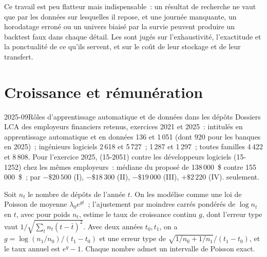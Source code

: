 Ce travail est peu flatteur mais indispensable~: un résultat de recherche ne vaut que par les données sur lesquelles il repose, et une journée manquante, un
horodatage erroné ou un univers biaisé par la survie peuvent produire un backtest faux dans chaque détail. Les  sont
jugés sur l'exhaustivité, l'exactitude et la ponctualité de ce qu'ils servent, et sur le coût de leur stockage et de leur transfert.

\section{Croissance et rémunération}

\begin{dated}{2025-09}{Rôles d'apprentissage automatique et de données dans les dépôts}\label{dat:in:machine-learning-and-data-engineer:filings}
Dossiers LCA des employeurs financiers retenus, exercices 2021 et 2025~: intitulés en apprentissage automatique et en données
136 et 1\,051 (dont 920 pour les banques en 2025)~; ingénieurs logiciels 2\,618 et 5\,727~;  1\,287 et 1\,297~;
toutes familles 4\,422 et 8\,808. Pour l'exercice 2025,  (15-2051) contre les développeurs logiciels (15-1252) chez les mêmes
employeurs~: médiane du  proposé de 138\,000~\$ contre 155\,000~\$~; par  $-\$20\,500$ (I), $-\$18\,300$ (II),
$-\$19\,000$ (III), $+\$2\,220$ (IV).  seulement.
\end{dated}

\begin{method}\label{met:in:machine-learning-and-data-engineer:trend}
Soit $n_t$ le nombre de dépôts de l'année $t$. On les modélise comme une loi de Poisson de moyenne $\lambda_0e^{g t}$~; l'ajustement par moindres carrés pondérés
de $\log n_t$ en $t$, avec pour poids $n_t$, estime le taux de croissance continu $g$, dont l'erreur type vaut
$1/\sqrt{\sum_t n_t(t-\bar t)^2}$. Avec deux années $t_0,t_1$, on a $g=\log(n_1/n_0)/(t_1-t_0)$ et
une erreur type de $\sqrt{1/n_0+1/n_1}/(t_1-t_0)$, et le taux annuel est $e^g-1$. Chaque nombre admet un intervalle de Poisson exact.
\end{method}

